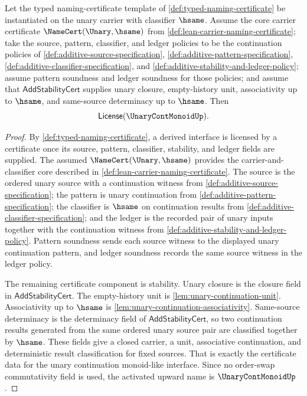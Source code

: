 \begin{theorem}
\label{thm:unary-continuation-monoid-activation}
Let the typed naming-certificate template of \autoref{def:typed-naming-certificate} be instantiated on the unary carrier with classifier \(\hsame\). Assume the core carrier certificate \(\NameCert(\Unary,\hsame)\) from \autoref{def:lean-carrier-naming-certificate}; take the source, pattern, classifier, and ledger policies to be the continuation policies of \autoref{def:additive-source-specification}, \autoref{def:additive-pattern-specification}, \autoref{def:additive-classifier-specification}, and \autoref{def:additive-stability-and-ledger-policy}; assume pattern soundness and ledger soundness for those policies; and assume that \(\mathsf{AddStabilityCert}\) supplies unary closure, empty-history unit, associativity up to \(\hsame\), and same-source determinacy up to \(\hsame\). Then
$$
  \mathsf{License}(\UnaryContMonoidUp).
$$
\end{theorem}
\begin{proof}
By \autoref{def:typed-naming-certificate}, a derived interface is licensed by a certificate once its source, pattern, classifier, stability, and ledger fields are supplied. The assumed \(\NameCert(\Unary,\hsame)\) provides the carrier-and-classifier core described in \autoref{def:lean-carrier-naming-certificate}. The source is the ordered unary source with a continuation witness from \autoref{def:additive-source-specification}; the pattern is unary continuation from \autoref{def:additive-pattern-specification}; the classifier is \(\hsame\) on continuation results from \autoref{def:additive-classifier-specification}; and the ledger is the recorded pair of unary inputs together with the continuation witness from \autoref{def:additive-stability-and-ledger-policy}. Pattern soundness sends each source witness to the displayed unary continuation pattern, and ledger soundness records the same source witness in the ledger policy.

The remaining certificate component is stability. Unary closure is the closure field in \(\mathsf{AddStabilityCert}\). The empty-history unit is \autoref{lem:unary-continuation-unit}. Associativity up to \(\hsame\) is \autoref{lem:unary-continuation-associativity}. Same-source determinacy is the determinacy field of \(\mathsf{AddStabilityCert}\), so two continuation results generated from the same ordered unary source pair are classified together by \(\hsame\). These fields give a closed carrier, a unit, associative continuation, and deterministic result classification for fixed sources. That is exactly the certificate data for the unary continuation monoid-like interface. Since no order-swap commutativity field is used, the activated upward name is \(\UnaryContMonoidUp\).
\end{proof}

